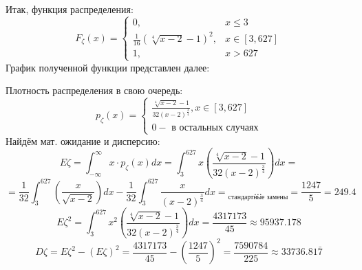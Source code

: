\begin{enumerate}
	Итак, функция распределения:
	\[
	F_{\zeta} (x) =
	\begin{cases}
		0, &x \le 3 \\
		\frac{1}{16} (\sqrt[4]{x-2} - 1)^2, &x \in [3, 627] \\
		1, &x > 627
	\end{cases}
	\]
	График полученной функции представлен далее:
	\begin{figure}[H]
	\end{figure}
	Плотность распределения в свою очередь:
	\[
	p_{\zeta} (x) =
	\begin{cases}
		\frac{\sqrt[4]{x-2}-1}{32(x-2)^{\frac{3}{4}}}, x \in [3, 627] \\
		0 - \text{ в остальных случаях}
	\end{cases}
	\]
	Найдём мат. ожидание и дисперсию:
	\[ E\zeta = \int_{-\infty}^{\infty} x \cdot p_{\zeta} (x) dx = \int_{3}^{627} x \left(\frac{\sqrt[4]{x-2}-1}{32(x-2)^{\frac{3}{4}}}\right) dx = \]
	\[ = \frac{1}{32} \int_{3}^{627} \left( \frac{x}{\sqrt{x-2}} \right) dx - \frac{1}{32} \int_{3}^{627} \frac{x}{(x-2)^{\frac{3}{4}}} dx = \underset{\text{стандартные замены}}{\dots} = \frac{1247}{5} = 249.4 \]
	\[ E\zeta^2 = \int_{3}^{627} x^2 \left(\frac{\sqrt[4]{x-2}-1}{32(x-2)^{\frac{3}{4}}}\right) dx = \frac{4317173}{45} \approx 95937.178 \]
	\[ D\zeta = E\zeta^2 - (E\zeta)^2 = \frac{4317173}{45} - \left( \frac{1247}{5} \right)^2 = \frac{7590784}{225} \approx 33736.81 \bar{7} \]
	

\end{enumerate}
